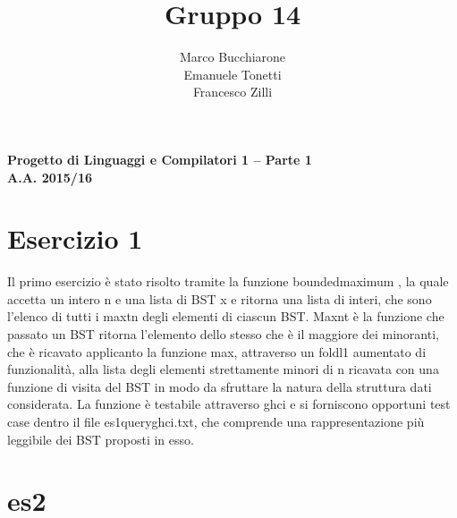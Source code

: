 \documentclass[a4paper, oneside, 11pt]{article}
\makeatletter
\renewcommand\and{\\}
\renewcommand\maketitle{%
\bigskip\bigskip\bigskip\bigskip%
\begin{center}\bfseries\large%
Progetto di Linguaggi e Compilatori 1 -- Parte 1 \\ A.A. 2015/16\\%
\end{center}%
\bigskip%
\begin{center}\bfseries\LARGE \@title  \end{center}%
\bigskip%
\begin{center}\bfseries\large \@author \end{center}%
\bigskip\bigskip}
\makeatother
\begin{document}
\title{Gruppo 14}
\author{Marco Bucchiarone \and Emanuele Tonetti \and Francesco Zilli}
\maketitle
\section{Esercizio 1}
Il primo esercizio è stato risolto tramite la funzione boundedmaximum , la quale accetta un intero n e una lista di BST x e ritorna una lista di interi, che sono l'elenco di tutti i maxtn degli elementi di ciascun BST. Maxnt è la funzione che passato un BST ritorna l'elemento dello stesso che è il maggiore dei minoranti, che è ricavato applicanto la funzione max, attraverso un foldl1 aumentato di funzionalità, alla lista degli elementi strettamente minori di n ricavata con una funzione di visita del BST in modo da sfruttare la natura della struttura dati considerata. La funzione è testabile attraverso ghci e si forniscono opportuni test case dentro il file es1queryghci.txt, che comprende una rappresentazione più leggibile dei BST proposti in esso.

\section{es2}
\end{document}
